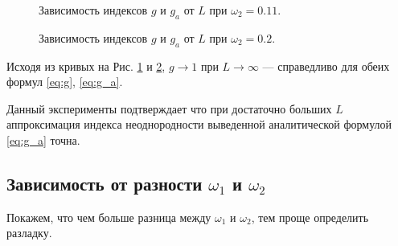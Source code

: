 \documentclass[specialist, substylefile = spbu.rtx,
			   subf, href, 12pt]{disser}
\begin{document}
\begin{figure}[!hhh]
	\caption{Зависимость индексов $ g $ и $ g_a $ от $ L $ при $ \omega_2 = 0.11 $.}
	\label{pic:g_c_vs_g_a_from_L}
\end{figure}

\begin{figure}[!hhh]
	\caption{Зависимость индексов $ g $ и $ g_a $ от $ L $ при $ \omega_2 = 0.2 $.}
	\label{pic:g_c_vs_g_a_from_L_1}
\end{figure}



Исходя из кривых на Рис. \ref{pic:g_c_vs_g_a_from_L} и \ref{pic:g_c_vs_g_a_from_L_1}, $ g \rightarrow 1 \text{ при } L \rightarrow \infty$ --- справедливо для обеих формул \eqref{eq:g}, \eqref{eq:g_a}. 

Данный эксперименты подтверждает что при достаточно больших $ L $ аппроксимация индекса неоднородности выведенной аналитической формулой \eqref{eq:g_a} точна.

\subsection{Зависимость от разности $\omega_1$ и $ \omega_2 $}
\newtheorem{statement}{Утверждение}

Покажем, что чем больше разница между $ \omega_1 $ и $ \omega_2 $, тем проще определить разладку.
\end{document}
